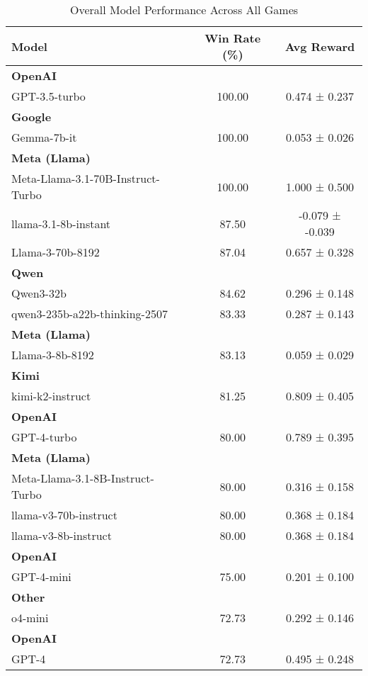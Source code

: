 \begin{table}[htbp]
\centering
\caption{Overall Model Performance Across All Games}
\label{tab:overall_performance}
\begin{tabular}{lcc}
\toprule
Model & Win Rate (\%) & Avg Reward \\
\midrule
\multicolumn{3}{l}{\textbf{OpenAI}}\\
GPT-3.5-turbo & 100.00 & 0.474 ± 0.237 \\
\midrule
\multicolumn{3}{l}{\textbf{Google}}\\
Gemma-7b-it & 100.00 & 0.053 ± 0.026 \\
\midrule
\multicolumn{3}{l}{\textbf{Meta (Llama)}}\\
Meta-Llama-3.1-70B-Instruct-Turbo & 100.00 & 1.000 ± 0.500 \\
llama-3.1-8b-instant & 87.50 & -0.079 ± -0.039 \\
Llama-3-70b-8192 & 87.04 & 0.657 ± 0.328 \\
\midrule
\multicolumn{3}{l}{\textbf{Qwen}}\\
Qwen3-32b & 84.62 & 0.296 ± 0.148 \\
qwen3-235b-a22b-thinking-2507 & 83.33 & 0.287 ± 0.143 \\
\midrule
\multicolumn{3}{l}{\textbf{Meta (Llama)}}\\
Llama-3-8b-8192 & 83.13 & 0.059 ± 0.029 \\
\midrule
\multicolumn{3}{l}{\textbf{Kimi}}\\
kimi-k2-instruct & 81.25 & 0.809 ± 0.405 \\
\midrule
\multicolumn{3}{l}{\textbf{OpenAI}}\\
GPT-4-turbo & 80.00 & 0.789 ± 0.395 \\
\midrule
\multicolumn{3}{l}{\textbf{Meta (Llama)}}\\
Meta-Llama-3.1-8B-Instruct-Turbo & 80.00 & 0.316 ± 0.158 \\
llama-v3-70b-instruct & 80.00 & 0.368 ± 0.184 \\
llama-v3-8b-instruct & 80.00 & 0.368 ± 0.184 \\
\midrule
\multicolumn{3}{l}{\textbf{OpenAI}}\\
GPT-4-mini & 75.00 & 0.201 ± 0.100 \\
\midrule
\multicolumn{3}{l}{\textbf{Other}}\\
o4-mini & 72.73 & 0.292 ± 0.146 \\
\midrule
\multicolumn{3}{l}{\textbf{OpenAI}}\\
GPT-4 & 72.73 & 0.495 ± 0.248 \\

\end{tabular}
\end{table}
